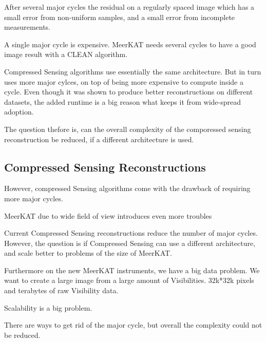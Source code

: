 After several major cycles the residual  on a regularly spaced image which has a small error from non-uniform samples, and a small error from incomplete measurements.

A single major cycle is expensive. MeerKAT needs several cycles to have a good image result with a CLEAN algorithm.

Compressed Sensing algorithms use essentially the same architecture. But in turn uses more major cylces, on top of being more expensive to compute inside a cycle. Even though it was shown to produce better reconstructions on different datasets, the added runtime is a big reason what keeps it from wide-spread adoption. 

The question thefore is, can the overall complexity of the comporessed sensing reconstruction be reduced, if a different architecture is used.


\subsection{Compressed Sensing Reconstructions}
 However, compressed Sensing algorithms come with the drawback of requiring more major cycles.

MeerKAT due to wide field of view introduces even more troubles

Current Compressed Sensing reconstructions reduce the number of major cycles. However, the question is if Compressed Sensing can use a different architecture, and scale better to problems of the size of MeerKAT.

Furthermore on the new MeerKAT instruments, we have a big data problem. We want to create a large image from a large amount of Visibilities. 32k*32k pixels and terabytes of raw Visibility data. 

Scalability is a big problem.

There are ways to get rid of the major cycle, but overall the complexity could not be reduced.









